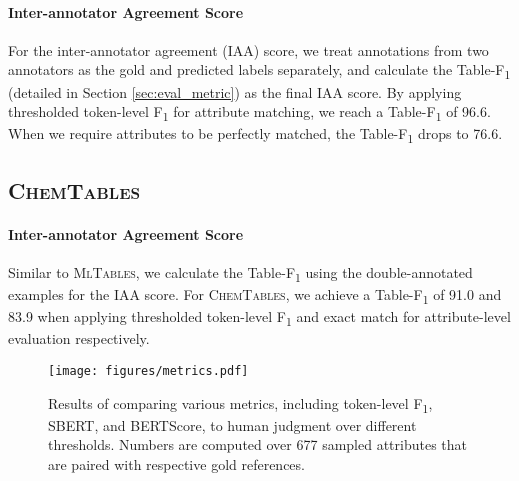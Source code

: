 \documentclass[11pt]{article}
\newcommand\data{\textsc{MlTables}}
\newcommand{\chemtables}{\textsc{ChemTables}}
\begin{document}
\paragraph{Inter-annotator Agreement Score} For the inter-annotator agreement (IAA) score, we treat annotations from two annotators as the gold and predicted labels separately, and calculate the Table-F\textsubscript{1} (detailed in Section \ref{sec:eval_metric}) as the final IAA score. By applying thresholded token-level F\textsubscript{1} for attribute matching, we reach a Table-F\textsubscript{1} of 96.6. When we require attributes to be perfectly matched, the Table-F\textsubscript{1} drops to 76.6.



\subsection{\chemtables{}}
\label{sec:chemtab_appendix}

\paragraph{Inter-annotator Agreement Score} Similar to \data{}, we calculate the Table-F\textsubscript{1} using the double-annotated examples for the IAA score. For \chemtables{}, we achieve a Table-F\textsubscript{1} of 91.0 and 83.9 when applying thresholded token-level F\textsubscript{1} and exact match for attribute-level evaluation respectively.











\begin{figure}[t]
    \centering
    \texttt{[image: figures/metrics.pdf]}
    \caption{
Results of comparing various metrics, including token-level F\textsubscript{1}, SBERT, and BERTScore, to human judgment over different thresholds. Numbers are computed over 677 sampled attributes that are paired with respective gold references.
}
    \label{fig:metrics}
\end{figure}
\end{document}
